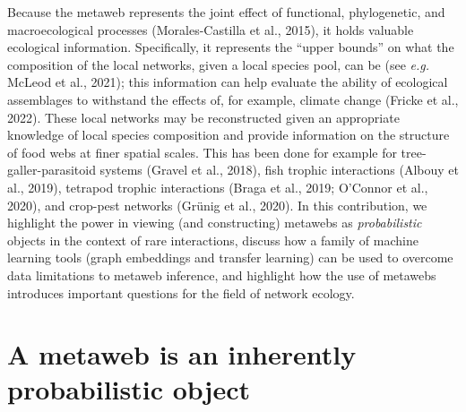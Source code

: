 \documentclass[10pt,oneside]{article}
\begin{document}
Because the metaweb represents the joint effect of functional,
phylogenetic, and macroecological processes (Morales-Castilla et al.,
2015), it holds valuable ecological information. Specifically, it
represents the ``upper bounds'' on what the composition of the local
networks, given a local species pool, can be (see \emph{e.g.} McLeod et
al., 2021); this information can help evaluate the ability of ecological
assemblages to withstand the effects of, for example, climate change
(Fricke et al., 2022). These local networks may be reconstructed given
an appropriate knowledge of local species composition and provide
information on the structure of food webs at finer spatial scales. This
has been done for example for tree-galler-parasitoid systems (Gravel et
al., 2018), fish trophic interactions (Albouy et al., 2019), tetrapod
trophic interactions (Braga et al., 2019; O'Connor et al., 2020), and
crop-pest networks (Grünig et al., 2020). In this contribution, we
highlight the power in viewing (and constructing) metawebs as
\emph{probabilistic} objects in the context of rare interactions,
discuss how a family of machine learning tools (graph embeddings and
transfer learning) can be used to overcome data limitations to metaweb
inference, and highlight how the use of metawebs introduces important
questions for the field of network ecology.

\hypertarget{a-metaweb-is-an-inherently-probabilistic-object}{%
\section{A metaweb is an inherently probabilistic
object}\label{a-metaweb-is-an-inherently-probabilistic-object}}
\end{document}
